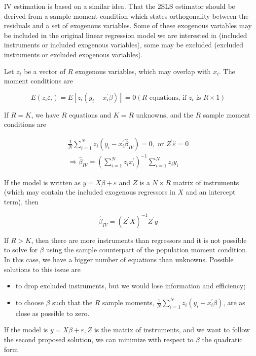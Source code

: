 IV estimation is based on a similar idea. That the 2SLS estimator should be derived from a sample moment condition which states orthogonality between the residuals and a set of exogenous variables. Some of these exogenous variables may be included in the original linear regression model we are interested in (included instruments or included exogenous variables), some may be excluded (excluded instruments or excluded exogenous variables).

Let $z_{i}$ be a vector of $R$ exogenous variables, which may overlap with $x_{i}$. The moment conditions are

$$
E\left(z_{i} \varepsilon_{i}\right)=E\left[z_{i}\left(y_{i}-x_{i}^{\prime} \beta\right)\right]=0\left(R \text { equations, if } z_{i} \text { is } R \times 1\right)
$$

If $R=K$, we have $R$ equations and $K=R$ unknowns, and the $R$ sample moment conditions are

$$
\begin{gathered}
\frac{1}{N} \sum_{i=1}^{N} z_{i}\left(y_{i}-x_{i}^{\prime} \widehat{\beta}_{I V}\right)=0, \text { or } Z^{\prime} \widehat{\varepsilon}=0 \\
\Longrightarrow \widehat{\beta}_{I V}=\left(\sum_{i=1}^{N} z_{i} x_{i}^{\prime}\right)^{-1} \sum_{i=1}^{N} z_{i} y_{i}
\end{gathered}
$$

If the model is written as $y=X \beta+\varepsilon$ and $Z$ is a $N \times R$ matrix of instruments (which may contain the included exogenous regressors in $X$ and an intercept term), then

$$
\widehat{\beta}_{I V}=\left(Z^{\prime} X\right)^{-1} Z^{\prime} y
$$

If $R>K$, then there are more instruments than regressors and it is not possible to solve for $\beta$ using the sample counterpart of the population moment condition. In this case, we have a bigger number of equations than unknowns. Possible solutions to this issue are

\begin{itemize}
  \item to drop excluded instruments, but we would lose information and efficiency;
  \item to choose $\beta$ such that the $R$ sample moments, $\frac{1}{N} \sum_{i=1}^{N} z_{i}\left(y_{i}-x_{i}^{\prime} \beta\right)$, are as close as possible to zero.
\end{itemize}

If the model is $y=X \beta+\varepsilon, Z$ is the matrix of instruments, and we want to follow the second proposed solution, we can minimize with respect to $\beta$ the quadratic form

